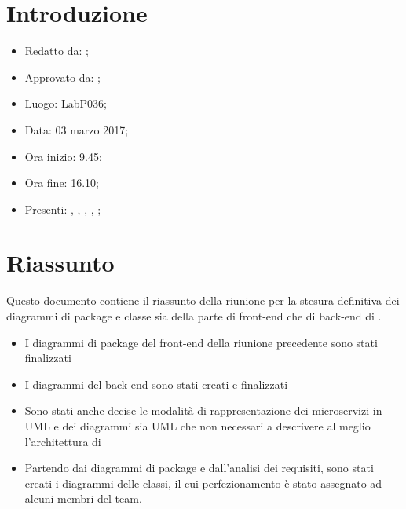 \section{Introduzione}

	\begin{itemize}
		\item Redatto da: \MC;
		\item Approvato da: \AS;
		\item Luogo: LabP036;
		\item Data: 03 marzo 2017;
		\item Ora inizio: 9.45;
		\item Ora fine: 16.10;
		\item Presenti: \AN, \AS, \DS, \MC, \NS;	
	\end{itemize}

\section{Riassunto}
Questo documento contiene il riassunto della riunione per la stesura definitiva dei diagrammi di package e classe sia della parte di front-end che di back-end di \progetto. 
\begin{itemize}
	\item I diagrammi di package del front-end della riunione precedente sono stati finalizzati
	\item I diagrammi del back-end sono stati creati e finalizzati
	\item Sono stati anche decise le modalità di rappresentazione dei microservizi in UML e dei diagrammi sia UML che non necessari a descrivere al meglio l'architettura di \progetto
	\item Partendo dai diagrammi di package e dall'analisi dei requisiti, sono stati creati i diagrammi delle classi, il cui perfezionamento è stato assegnato ad alcuni membri del team.
	
\end{itemize}

